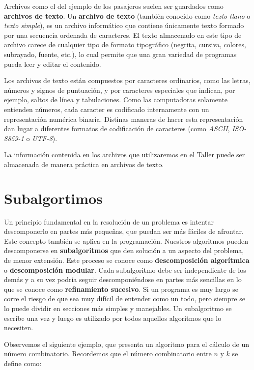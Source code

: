 \documentclass[]{book}
\begin{document}
Archivos como el del ejemplo de los pasajeros suelen ser guardados como \textbf{archivos de texto}. Un \textbf{archivo de texto} (también conocido como \emph{texto llano} o \emph{texto simple}), es un archivo informático que contiene únicamente texto formado por una secuencia ordenada de caracteres. El texto almacenado en este tipo de archivo carece de cualquier tipo de formato tipográfico (negrita, cursiva, colores, subrayado, fuente, etc.), lo cual permite que una gran variedad de programas pueda leer y editar el contenido.

Los archivos de texto están compuestos por caracteres ordinarios, como las letras, números y signos de puntuación, y por caracteres especiales que indican, por ejemplo, saltos de línea y tabulaciones. Como las computadoras solamente entienden números, cada caracter es codificado internamente con un representación numérica binaria. Distinas maneras de hacer esta representación dan lugar a diferentes formatos de codificación de caracteres (como \emph{ASCII}, \emph{ISO-8859-1} o \emph{UTF-8}).

La información contenida en los archivos que utilizaremos en el Taller puede ser almacenada de manera práctica en archivos de texto.

\hypertarget{subalgortimos}{%
\chapter{Subalgortimos}\label{subalgortimos}}

Un principio fundamental en la resolución de un problema es intentar descomponerlo en partes más pequeñas, que puedan ser más fáciles de afrontar. Este concepto también se aplica en la programación. Nuestros algoritmos pueden descomponerse en \textbf{subalgoritmos} que den solución a un aspecto del problema, de menor extensión. Este proceso se conoce como \textbf{descomposición algorítmica} o \textbf{descomposición modular}. Cada subalgoritmo debe ser independiente de los demás y a su vez podría seguir descomponiéndose en partes más sencillas en lo que se conoce como \textbf{refinamiento sucesivo}. Si un programa es muy largo se corre el riesgo de que sea muy difícil de entender como un todo, pero siempre se lo puede dividir en secciones más simples y manejables. Un subalgoritmo se escribe una vez y luego es utilizado por todos aquellos algoritmos que lo necesiten.

Observemos el siguiente ejemplo, que presenta un algoritmo para el cálculo de un número combinatorio. Recordemos que el número combinatorio entre \(n\) y \(k\) se define como:
\end{document}
